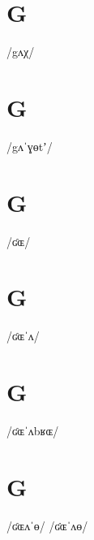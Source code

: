 \documentclass[10pt,a4paper,twoside]{book}
\begin{document}
\section*{G}

\begin{multicols}{3}
 {/gʌχ/} {}
\end{multicols}

\section*{G}

\begin{multicols}{3}
 {/gʌˈɣɵtʼ/} {}
\end{multicols}

\section*{G}

\begin{multicols}{3}
 {/ʛɶ/} {}
\end{multicols}

\section*{G}

\begin{multicols}{3}
 {/ʛɶˈʌ/} {}
\end{multicols}

\section*{G}

\begin{multicols}{3}
 {/ʛɶˈʌbʁɶ/} {}
\end{multicols}

\section*{G}

\begin{multicols}{3}
 {/ʛɶʌˈɵ/} {}
 {/ʛɶˈʌɵ/} {}
\end{multicols}
\end{document}
